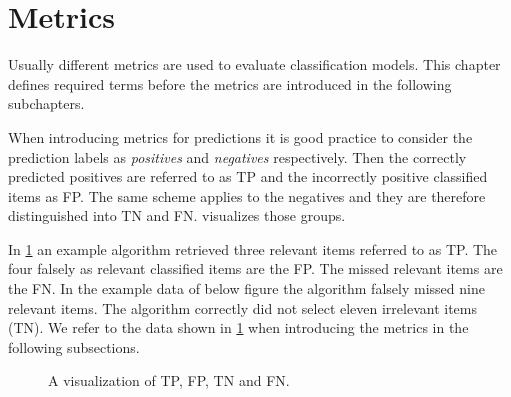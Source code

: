 \section{Metrics}
\label{chp:fundamentals:sec:metrics}

Usually different metrics are used to evaluate classification models.
This chapter defines required terms before the metrics are introduced in the following subchapters.

When introducing metrics for predictions it is good practice to consider the prediction labels as \textit{positives} and \textit{negatives} respectively.
Then the correctly predicted positives are referred to as \ac{TP} and the incorrectly positive classified items as \ac{FP}.
The same scheme applies to the negatives and they are therefore distinguished into \ac{TN} and \ac{FN}.
 visualizes those groups. \parencite{Powers:2011}

In \cref{fig:metrics:tp_vis} an example algorithm retrieved three relevant items referred to as \ac{TP}.
The four falsely as relevant classified items are the \ac{FP}.
The missed relevant items are the \ac{FN}.
In the example data of below figure the algorithm falsely missed nine relevant items.
The algorithm correctly did not select eleven irrelevant items (\ac{TN}).
We refer to the data shown in \cref{fig:metrics:tp_vis} when introducing the metrics in the following subsections.
\begin{figure}[htpb]
    \centering
    \def\svgwidth{\columnwidth}
    
    \caption[Visualization of True Positives]{A visualization of \ac{TP}, \ac{FP}, \ac{TN} and \ac{FN}.}\label{fig:metrics:tp_vis}
\end{figure}





